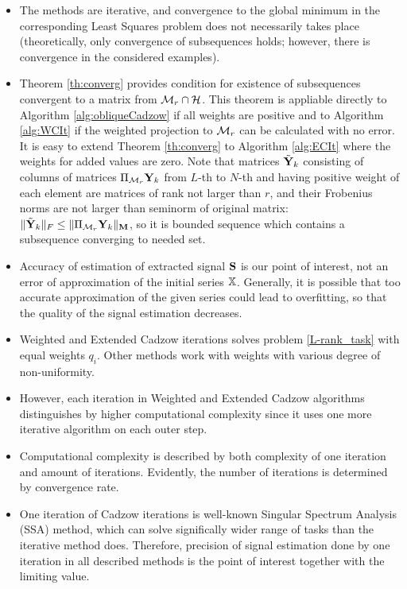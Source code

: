 \documentclass[sii]{ipart}
\begin{document}
	\begin{itemize}
		\item
		The methods are iterative, and convergence to the global minimum in the corresponding Least Squares problem does not necessarily takes place (theoretically, only convergence of subsequences holds; however, there is convergence in the considered examples). %
		\item
		Theorem \ref{th:converg} provides condition for existence of subsequences convergent to a matrix from $\mathcal{M}_r \cap \mathcal{H}$. This theorem is appliable directly to Algorithm \ref{alg:obliqueCadzow} if all weights are positive and to Algorithm \ref{alg:WCIt} if the weighted projection to $\mathcal{M}_r$ can be calculated with no error. It is easy to extend Theorem \ref{th:converg} to Algorithm \ref{alg:ECIt} where the weights for added values are zero. Note that matrices $\tilde {\mathbf{Y}}_k$ consisting of columns of matrices $\Pi_{\mathcal{M}_r} \mathbf{Y}_k$ from $L$-th to $N$-th and having positive weight of each element are matrices of rank not larger than $r$, and their Frobenius norms are not larger than seminorm of original matrix: $\|\tilde {\mathbf{Y}}_k\|_F \le \|\Pi_{\mathcal{M}_r} \mathbf{Y}_k\|_{\mathbf{M}}$, so it is bounded sequence which contains a subsequence converging to needed set.
		\item
		Accuracy of estimation of extracted signal $\mathbf{S}$ is our point of interest, not an error of approximation of the initial series $\mathbb{X}$. Generally, it is possible that too accurate approximation of the given series could lead to overfitting, so that the quality of the signal estimation decreases.
		\item
		Weighted and Extended Cadzow iterations solves problem \eqref{L-rank_task} with equal weights $q_i$. Other methods work with weights with various degree of non-uniformity.
		\item
		However, each iteration in Weighted and Extended Cadzow algorithms distinguishes by higher computational complexity since it uses one more iterative algorithm on each outer step.
		\item
		Computational complexity is described by both complexity of one iteration and amount of iterations. Evidently, the number of iterations is determined by convergence rate.
		\item
		One iteration of Cadzow iterations is well-known Singular Spectrum Analysis (SSA) method, which can solve significally wider range of tasks than the iterative method does. Therefore, precision of signal estimation done by one iteration in all described methods is the point of interest together with the limiting value.

\end{itemize}
\end{document}
